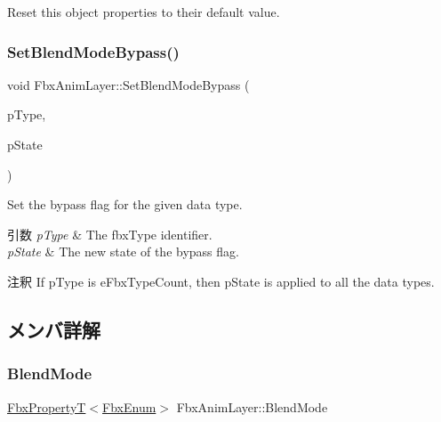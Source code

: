 Reset this object properties to their default value. 

\mbox{\label{class_fbx_anim_layer_a8be5d3511971847c8f8d88c0a9fe2158}} 
\subsubsection{\texorpdfstring{Set\+Blend\+Mode\+Bypass()}{SetBlendModeBypass()}}
{\footnotesize\ttfamily void Fbx\+Anim\+Layer\+::\+Set\+Blend\+Mode\+Bypass (\begin{DoxyParamCaption}\item[{\hyperlink{fbxpropertytypes_8h_a73913a5ddfb20e57c6f25e9e6784bd92}{E\+Fbx\+Type}}]{p\+Type,  }\item[{bool}]{p\+State }\end{DoxyParamCaption})}

Set the bypass flag for the given data type. 
\begin{DoxyParams}{引数}
{\em p\+Type} & The fbx\+Type identifier. \\
\hline
{\em p\+State} & The new state of the bypass flag. \\
\hline
\end{DoxyParams}
\begin{DoxyRemark}{注釈}
If p\+Type is e\+Fbx\+Type\+Count, then p\+State is applied to all the data types. 
\end{DoxyRemark}


\subsection{メンバ詳解}
\mbox{\label{class_fbx_anim_layer_a7e4d4d009aa2c248d19781e9d31f1f89}} 
\subsubsection{\texorpdfstring{Blend\+Mode}{BlendMode}}
{\footnotesize\ttfamily \hyperlink{class_fbx_property_t}{Fbx\+PropertyT}$<$\hyperlink{fbxtypes_8h_a9a28614cb4272a0ad7d748eda7f3d3e5}{Fbx\+Enum}$>$ Fbx\+Anim\+Layer\+::\+Blend\+Mode}

